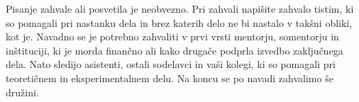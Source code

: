 
Pisanje zahvale ali posvetila je neobvezno. Pri zahvali napišite zahvalo tistim, ki so pomagali pri nastanku dela in brez katerih delo ne bi nastalo v takšni obliki, kot je. Navadno se je potrebno zahvaliti v prvi vrsti mentorju, somentorju in inštituciji, ki je morda finančno ali kako drugače podprla izvedbo zaključnega dela. Nato sledijo asistenti, ostali sodelavci in vaši kolegi, ki so pomagali pri teoretičnem in eksperimentalnem delu. Na koncu se po navadi zahvalimo še družini.

